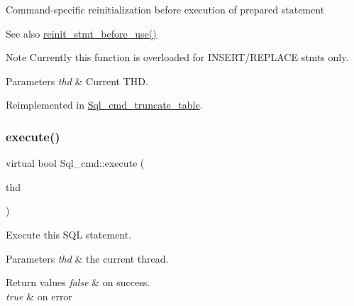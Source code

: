 Command-\/specific reinitialization before execution of prepared statement

\begin{DoxySeeAlso}{See also}
\mbox{\hyperlink{sql__prepare_8cc_a230ccb139578f6e2099fcd40a6ca57ad}{reinit\+\_\+stmt\+\_\+before\+\_\+use()}}
\end{DoxySeeAlso}
\begin{DoxyNote}{Note}
Currently this function is overloaded for I\+N\+S\+E\+R\+T/\+R\+E\+P\+L\+A\+CE stmts only.
\end{DoxyNote}

\begin{DoxyParams}{Parameters}
{\em thd} & Current T\+HD. \\
\hline
\end{DoxyParams}


Reimplemented in \mbox{\hyperlink{classSql__cmd__truncate__table_aef61dc712f14dc3f3c0a343806f5de54}{Sql\+\_\+cmd\+\_\+truncate\+\_\+table}}.

\mbox{\label{classSql__cmd_a213367b79b551296fbb7790f2a3732fb}} 
\subsubsection{\texorpdfstring{execute()}{execute()}}
{\footnotesize\ttfamily virtual bool Sql\+\_\+cmd\+::execute (\begin{DoxyParamCaption}\item[{T\+HD $\ast$}]{thd }\end{DoxyParamCaption})\hspace{0.3cm}{\ttfamily [pure virtual]}}

Execute this S\+QL statement. 
\begin{DoxyParams}{Parameters}
{\em thd} & the current thread. \\
\hline
\end{DoxyParams}

\begin{DoxyRetVals}{Return values}
{\em false} & on success. \\
\hline
{\em true} & on error \\
\hline
\end{DoxyRetVals}


